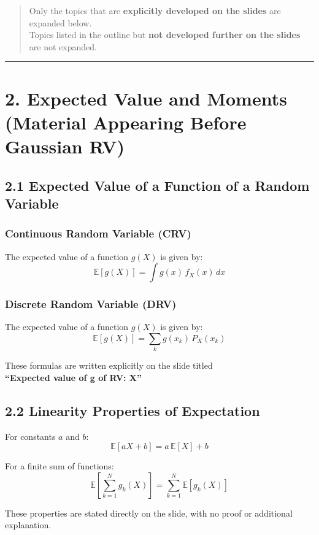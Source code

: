 \documentclass[12pt]{article}
\begin{document}
\begin{quote}
Only the topics that are \textbf{explicitly developed on the slides} are expanded below. \\
Topics listed in the outline but \textbf{not developed further on the slides} are not expanded.
\end{quote}

\hrule
\vspace{1em}

\section*{2. Expected Value and Moments (Material Appearing Before Gaussian RV)}

\subsection*{2.1 Expected Value of a Function of a Random Variable}

\subsubsection*{Continuous Random Variable (CRV)}

The expected value of a function $g(X)$ is given by:
\[
\mathbb{E}[g(X)] = \int g(x)\, f_X(x)\, dx
\]

\subsubsection*{Discrete Random Variable (DRV)}

The expected value of a function $g(X)$ is given by:
\[
\mathbb{E}[g(X)] = \sum_k g(x_k)\, P_X(x_k)
\]

These formulas are written explicitly on the slide titled \\
\textbf{“Expected value of g of RV: X”}

\subsection*{2.2 Linearity Properties of Expectation}

For constants $a$ and $b$:
\[
\mathbb{E}[aX + b] = a\,\mathbb{E}[X] + b
\]

For a finite sum of functions:
\[
\mathbb{E}\!\left[\sum_{k=1}^{N} g_k(X)\right]
=
\sum_{k=1}^{N} \mathbb{E}[g_k(X)]
\]

These properties are stated directly on the slide, with no proof or additional explanation.
\end{document}
